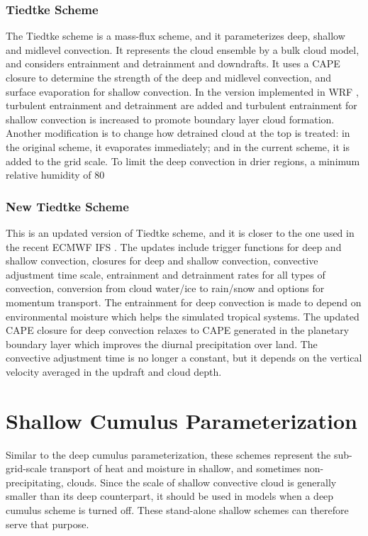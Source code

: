 \subsubsection{Tiedtke Scheme}

The Tiedtke scheme is a mass-flux scheme, and it parameterizes deep, 
shallow and midlevel convection. It represents the cloud ensemble by a bulk cloud model, 
and considers entrainment and detrainment and downdrafts. It uses a CAPE closure to 
determine the strength of the deep and midlevel convection, and surface evaporation 
for shallow convection. In the version implemented in WRF \citep{zhangc11}, turbulent 
entrainment and detrainment are added and turbulent entrainment for shallow convection 
is increased to promote boundary layer cloud formation. Another modification is to change 
how detrained cloud at the top is treated: in the original scheme, it evaporates immediately; 
and in the current scheme, it is added to the grid scale. To limit the deep convection in 
drier regions, a minimum relative humidity of 80%

\subsubsection{New Tiedtke Scheme}

This is an updated version of Tiedtke scheme, and it is closer to the one used in the 
recent ECMWF IFS \citep{zhangc17}. The updates include trigger functions for deep and shallow convection, 
closures for deep and shallow convection, convective adjustment time scale, entrainment 
and detrainment rates for all types of convection, conversion from cloud water/ice to 
rain/snow and options for momentum transport. The entrainment for deep convection is 
made to depend on environmental moisture which helps the simulated tropical systems. 
The updated CAPE closure for deep convection relaxes to CAPE generated in the planetary 
boundary layer which improves the diurnal precipitation over land. The convective 
adjustment time is no longer a constant, but it depends on the vertical velocity averaged 
in the updraft and cloud depth.


\section{Shallow Cumulus Parameterization}

Similar to the deep cumulus parameterization, these schemes represent the sub-grid-scale transport of heat 
and moisture in shallow, and sometimes non-precipitating, clouds. Since the scale of shallow convective
cloud is generally smaller than its deep counterpart, it should be used in models when a deep cumulus
scheme is turned off. These stand-alone shallow schemes can therefore serve that purpose. 


